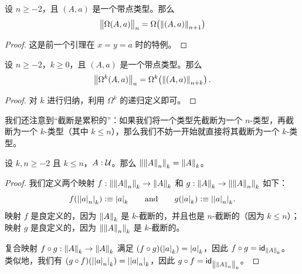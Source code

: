 \begin{cor}
  设 $n\ge-2$，且 $(A,a)$ 是一个带点类型。那么
  \[\ttrunc n{\Omega(A,a)}=\Omega\mathopen{}\left(\trunc{n+1}{(A,a)}\right)\]
\end{cor}

\begin{proof}
  这是前一个引理在 $x=y=a$ 时的特例。
\end{proof}

\begin{cor}
  设 $n\ge -2$，$k\ge 0$，且 $(A,a)$ 是一个带点类型。那么
  \[\ttrunc n{\Omega^k(A,a)} = \Omega^k\mathopen{}\left(\trunc{n+k}{(A,a)}\right). \]
\end{cor}

\begin{proof}
  对 $k$ 进行归纳，利用 $\Omega^k$ 的递归定义即可。
\end{proof}

我们还注意到“截断是累积的”：如果我们将一个类型先截断为一个 $n$-类型，再截断为一个 $k$-类型（其中 $k\le n$），那么我们不妨一开始就直接将其截断为一个 $k$-类型。

\begin{lem} \label{lem:truncation-le}
  设 $k,n\ge-2$ 且 $k\le{}n$，$A:\type$。那么
  $\trunc k{\trunc nA}=\trunc kA$。
\end{lem}

\begin{proof}
  我们定义两个映射 $f:\trunc k{\trunc nA}\to\trunc kA$ 和
  $g:\trunc kA\to\trunc k{\trunc nA}$ 如下：
  \[
   f(\tproj k{\tproj na}) \defeq \tproj ka
   \qquad\text{and}\qquad
   g(\tproj ka) \defeq \tproj k{\tproj na}.
  \]
  映射 $f$ 是良定义的，因为 $\trunc kA$ 是 $k$-截断的，并且也是 $n$-截断的（因为 $k\le{}n$）；映射 $g$ 是良定义的，因为 $\trunc k{\trunc nA}$ 是 $k$-截断的。

  复合映射 $f\circ{}g:\trunc kA\to\trunc kA$ 满足
  $(f\circ{}g)(\tproj ka)=\tproj ka$，因此 $f\circ{}g=\idfunc[\trunc kA]$。
  类似地，我们有 $(g\circ{}f)(\tproj k{\tproj na})=\tproj k{\tproj na}$，因此 $g\circ{}f=\idfunc[\trunc k{\trunc nA}]$。
\end{proof}


